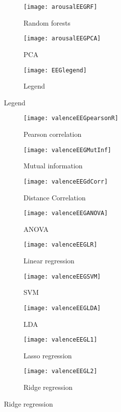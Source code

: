 \begin{figure}[!tbp]
  \begin{subfigure}[b]{0.3\textwidth}
    \texttt{[image: arousalEEGRF]}
    \caption{Random forests}
  \end{subfigure}
  \hfill
  \begin{subfigure}[b]{0.3\textwidth}
    \texttt{[image: arousalEEGPCA]} %
    \caption{PCA}
  \end{subfigure}
  \hfill
  \begin{subfigure}[b]{0.3\textwidth}
    \texttt{[image: EEGlegend]}
    \caption{Legend\label{arousalpieslegend}}
  \end{subfigure}
\end{figure}

\clearpage

\begin{figure}[!tbp]
  \centering
  \caption{Selection features for valence classification, using only EEG features.\label{valenceEEGpies}}
  \begin{subfigure}[b]{0.3\textwidth}
    \texttt{[image: valenceEEGpearsonR]}
    \caption{Pearson correlation}
  \end{subfigure}
  \hfill
  \begin{subfigure}[b]{0.3\textwidth}
    \texttt{[image: valenceEEGMutInf]}
    \caption{Mutual information}
  \end{subfigure}
  \hfill
  \begin{subfigure}[b]{0.3\textwidth}
    \texttt{[image: valenceEEGdCorr]}
    \caption{Distance Correlation}
  \end{subfigure}
  
  \begin{subfigure}[b]{0.3\textwidth}
    \texttt{[image: valenceEEGANOVA]}
    \caption{ANOVA}
  \end{subfigure}
  \hfill
  \begin{subfigure}[b]{0.3\textwidth}
    \texttt{[image: valenceEEGLR]}
    \caption{Linear regression}
  \end{subfigure}
  \hfill
  \begin{subfigure}[b]{0.3\textwidth}
    \texttt{[image: valenceEEGSVM]}
    \caption{SVM}
  \end{subfigure}
  
  \begin{subfigure}[b]{0.3\textwidth}
    \texttt{[image: valenceEEGLDA]}
    \caption{LDA}
  \end{subfigure}
  \hfill
  \begin{subfigure}[b]{0.3\textwidth}
    \texttt{[image: valenceEEGL1]}
    \caption{Lasso regression}
  \end{subfigure}
  \hfill
  \begin{subfigure}[b]{0.3\textwidth}
    \texttt{[image: valenceEEGL2]}
    \caption{Ridge regression}
  \end{subfigure}
  

\end{figure}
